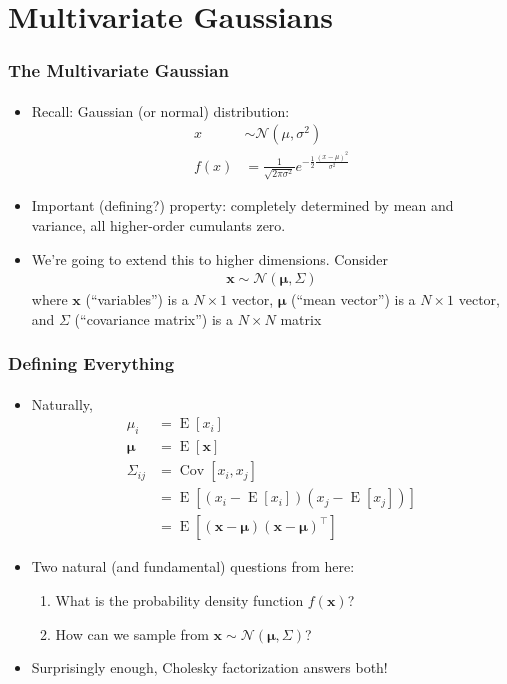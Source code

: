 \documentclass{beamer}                             %
\renewcommand{\vec}[1]{\bm{#1}}
\DeclareMathOperator{\E}{E}
\DeclareMathOperator{\Cov}{Cov}
\begin{document}
\section{Multivariate Gaussians}

\begin{frame}
\frametitle{The Multivariate Gaussian}
\framesubtitle{}
\begin{itemize}
  \item<+-> Recall: Gaussian (or normal) distribution:
    \begin{align*}
      x &\sim \mathcal{N}(\mu, \sigma^2) \\
      f(x) &= \frac{1}{\sqrt{2 \pi \sigma^2}}
        e^{-\frac{1}{2} \frac{(x - \mu)^2}{\sigma^2}}
    \end{align*}
  \item<+-> Important (defining?) property: completely determined
    by mean and variance, all higher-order cumulants zero.
  \item<+-> We're going to extend this to higher dimensions. Consider
    \begin{align*}
      \vec{x} \sim \mathcal{N}(\vec{\mu}, \Sigma)
    \end{align*}
    where \( \vec{x} \) (\enquote{variables}) is a \( N \times 1 \) vector,
    \( \vec{\mu} \) (\enquote{mean vector}) is a \( N \times 1 \) vector, and
    \( \Sigma \) (\enquote{covariance matrix}) is a \( N \times N \) matrix
\end{itemize}
\end{frame}

\begin{frame}
\frametitle{Defining Everything}
\framesubtitle{}
\begin{itemize}
  \item<+-> Naturally,
    \begin{align*}
      \mu_i &= \E[x_i] \\
      \vec{\mu} &= \E[\vec{x}] \\
      \Sigma_{ij} &= \Cov[x_i, x_j] \\
                  &= \E[(x_i - \E[x_i])(x_j - \E[x_j])] \\
                  &= \E[(\vec{x} - \vec{\mu}) (\vec{x} - \vec{\mu})^{\top}]
    \end{align*}
  \item<+-> Two natural (and fundamental) questions from here:
    \begin{enumerate}
      \item What is the probability density function \( f(\vec{x}) \)?
      \item How can we sample from
        \( \vec{x} \sim \mathcal{N}(\vec{\mu}, \Sigma) \)?
    \end{enumerate}
  \item<+-> Surprisingly enough, Cholesky factorization answers both!
\end{itemize}
\end{frame}
\end{document}
